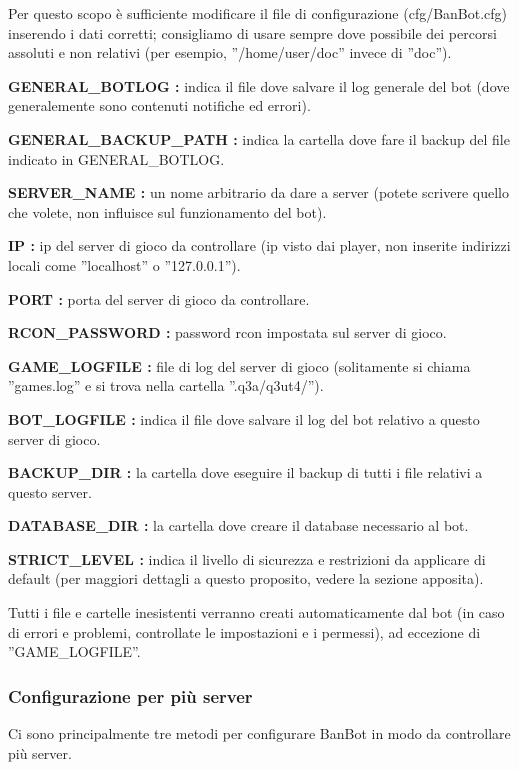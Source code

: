 \documentclass[a4paper]{article}
\begin{document}
Per questo scopo \`e sufficiente modificare il file di configurazione (cfg/BanBot.cfg) inserendo i dati corretti; consigliamo di usare sempre dove possibile dei percorsi assoluti e non relativi (per esempio, ''/home/user/doc'' invece di ''doc'').
\begin{description}
\item{\textbf{GENERAL\_BOTLOG :}} indica il file dove salvare il log generale del bot (dove generalemente sono contenuti notifiche ed errori).
\item{\textbf{GENERAL\_BACKUP\_PATH :}} indica la cartella dove fare il backup del file indicato in GENERAL\_BOTLOG.
\item{\textbf{SERVER\_NAME :}} un nome arbitrario da dare a server (potete scrivere quello che volete, non influisce sul funzionamento del bot).
\item{\textbf{IP :}} ip del server di gioco da controllare (ip visto dai player, non inserite indirizzi locali come ''localhost'' o ''127.0.0.1'').
\item{\textbf{PORT :}} porta del server di gioco da controllare.
\item{\textbf{RCON\_PASSWORD :}} password rcon impostata sul server di gioco.
\item{\textbf{GAME\_LOGFILE :}} file di log del server di gioco (solitamente si chiama ''games.log'' e si trova nella cartella ''.q3a/q3ut4/'').
\item{\textbf{BOT\_LOGFILE :}} indica il file dove salvare il log del bot relativo a questo server di gioco.
\item{\textbf{BACKUP\_DIR :}} la cartella dove eseguire il backup di tutti i file relativi a questo server.
\item{\textbf{DATABASE\_DIR :}} la cartella dove creare il database necessario al bot.
\item{\textbf{STRICT\_LEVEL :}} indica il livello di sicurezza e restrizioni da applicare di default (per maggiori dettagli a questo proposito, vedere la sezione apposita).
\end{description}

Tutti i file e cartelle inesistenti verranno creati automaticamente dal bot (in caso di errori e problemi, controllate le impostazioni e i permessi), ad eccezione di ''GAME\_LOGFILE''.

\subsubsection {Configurazione per pi\`u server}
Ci sono principalmente tre metodi per configurare BanBot in modo da controllare pi\`u server.
\end{document}
